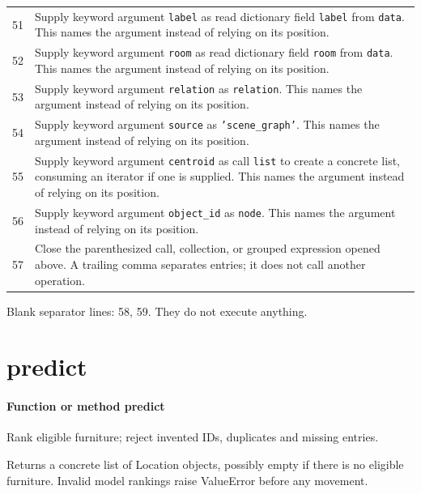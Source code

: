 \documentclass[11pt,a4paper]{book}
\begin{document}
\begin{longtable}{r p{}}
51 & Supply keyword argument \texttt{label} as read dictionary field \texttt{label} from \texttt{data}. This names the argument instead of relying on its position. \\

52 & Supply keyword argument \texttt{room} as read dictionary field \texttt{room} from \texttt{data}. This names the argument instead of relying on its position. \\

53 & Supply keyword argument \texttt{relation} as \texttt{relation}. This names the argument instead of relying on its position. \\

54 & Supply keyword argument \texttt{source} as \texttt{'scene\_graph'}. This names the argument instead of relying on its position. \\

55 & Supply keyword argument \texttt{centroid} as call \texttt{list} to create a concrete list, consuming an iterator if one is supplied. This names the argument instead of relying on its position. \\

56 & Supply keyword argument \texttt{object\_id} as \texttt{node}. This names the argument instead of relying on its position. \\

57 & Close the parenthesized call, collection, or grouped expression opened above. A trailing comma separates entries; it does not call another operation. \\

\end{longtable}

Blank separator lines: 58, 59. They do not execute anything.

\section{predict}

\paragraph{Function or method predict}
Rank eligible furniture; reject invented IDs, duplicates and missing entries.

Returns a concrete list of Location objects, possibly empty if there is no eligible furniture. Invalid model rankings raise ValueError before any movement.
\end{document}
